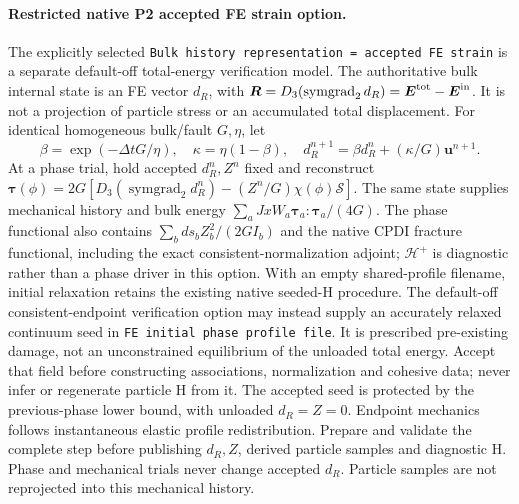 \documentclass[11pt]{article}
\begin{document}
\paragraph{Restricted native P2 accepted FE strain option.}
The explicitly selected \texttt{Bulk history representation = accepted FE strain}
is a separate default-off total-energy verification model. The authoritative
bulk internal state is an FE vector $d_R$, with
$\boldsymbol R=D_3(\operatorname{symgrad}_2d_R)=\boldsymbol E^{\rm tot}-\boldsymbol E^{\rm in}$.
It is not a projection of particle stress or an accumulated total displacement.
For identical homogeneous bulk/fault $G,\eta$, let
\[
 \beta=\exp(-\Delta t G/\eta),\quad
 \kappa=\eta(1-\beta),\quad
 d_R^{n+1}=\beta d_R^n+(\kappa/G)\boldsymbol u^{n+1}.
\]
At a phase trial, hold accepted $d_R^n,Z^n$ fixed and reconstruct
$\boldsymbol\tau(\phi)=2G[D_3(\operatorname{symgrad}_2d_R^n)-(Z^n/G)\chi(\phi)\mathcal S]$.
The same state supplies mechanical history and bulk energy
$\sum_a JxW_a\boldsymbol\tau_a:\boldsymbol\tau_a/(4G)$.
The phase functional also contains $\sum_b ds_b Z_b^2/(2G I_b)$ and the native
CPDI fracture functional, including the exact consistent-normalization adjoint;
$\mathcal H^+$ is diagnostic rather than a phase driver in this option.
With an empty shared-profile filename, initial relaxation retains the existing
native seeded-H procedure. The default-off consistent-endpoint verification
option may instead supply an accurately relaxed continuum seed in
\texttt{FE initial phase profile file}. It is prescribed pre-existing damage,
not an unconstrained equilibrium of the unloaded total energy. Accept that
field before constructing associations, normalization and cohesive data;
never infer or regenerate particle H from it. The accepted seed is protected
by the previous-phase lower bound, with unloaded $d_R=Z=0$.
Endpoint mechanics follows instantaneous elastic profile redistribution.
Prepare and validate the complete step before publishing $d_R,Z$, derived
particle samples and diagnostic H. Phase and mechanical trials never change
accepted $d_R$. Particle samples are not reprojected into this mechanical history.
\end{document}
